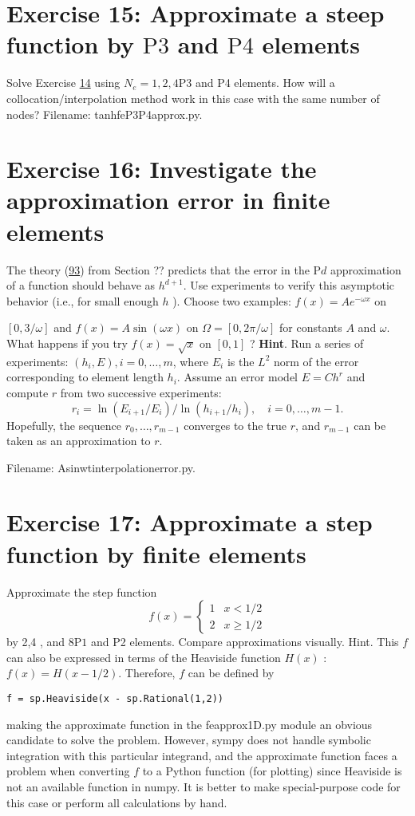 \documentclass[../main.tex]{subfiles}
\begin{document}
\section*{Exercise 15: Approximate a steep function by $\mathrm{P} 3$ and $\mathrm{P} 4$ elements}
\label{sec:sec_10_15}
\noindent Solve Exercise \hyperref[sec:sec_10_14]{14} using $N_{e}=1,2,4 \mathrm{P} 3$ and P4 elements. How will a collocation/interpolation method work in this case with the same number of nodes? Filename: tanh\textunderscore fe\textunderscore P3P4\textunderscore approx.py.
\bigbreak
\section*{Exercise 16: Investigate the approximation error in finite elements}
\label{sec:sec_10_16}
\noindent The theory (\hyperref[eqa93]{93}) from Section ?? predicts that the error in the $\mathrm{P} d$ approximation of a function should behave as $h^{d+1}$. Use experiments to verify this asymptotic behavior (i.e., for small enough $h$ ). Choose two examples: $f(x)=A e^{-\omega x}$ on

$[0,3 / \omega]$ and $f(x)=A \sin (\omega x)$ on $\Omega=[0,2 \pi / \omega]$ for constants $A$ and $\omega$. What happens if you try $f(x)=\sqrt{x}$ on $[0,1]$ ?
\bigbreak
\noindent \textbf{Hint}. Run a series of experiments: $\left(h_{i}, E\right), i=0, \ldots, m$, where $E_{i}$ is the $L^{2}$ norm of the error corresponding to element length $h_{i}$. Assume an error model $E=C h^{r}$ and compute $r$ from two successive experiments:
$$
r_{i}=\ln \left(E_{i+1} / E_{i}\right) / \ln \left(h_{i+1} / h_{i}\right), \quad i=0, \ldots, m-1 .
$$
Hopefully, the sequence $r_{0}, \ldots, r_{m-1}$ converges to the true $r$, and $r_{m-1}$ can be taken as an approximation to $r$.

Filename: Asinwt\textunderscore interpolation\textunderscore error.py.
\bigbreak
\section*{Exercise 17: Approximate a step function by finite elements}
\label{sec:sec_10_17}
\noindent Approximate the step function
$$
f(x)= \begin{cases}1 & x<1 / 2 \\ 2 & x \geq 1 / 2\end{cases}
$$
by 2,4 , and $8 \mathrm{P} 1$ and P2 elements. Compare approximations visually.
Hint. This $f$ can also be expressed in terms of the Heaviside function $H(x)$ : $f(x)=H(x-1 / 2)$. Therefore, $f$ can be defined by
\begin{lstlisting}[numbers=none]
f = sp.Heaviside(x - sp.Rational(1,2))	
\end{lstlisting}
making the approximate function in the fe\textunderscore approx1D.py module an obvious candidate to solve the problem. However, sympy does not handle symbolic integration with this particular integrand, and the approximate function faces a problem when converting $f$ to a Python function (for plotting) since Heaviside is not an available function in numpy. It is better to make special-purpose code for this case or perform all calculations by hand.
\end{document}
